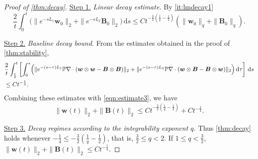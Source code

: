 \documentclass[10pt]{amsart}
\theoremstyle{plain}
\theoremstyle{definition}
\theoremstyle{remark}
\numberwithin{equation}{section}
\newcommand{\bw}{{\boldsymbol{w}}}
\newcommand{\bB}{{\boldsymbol{B}}}
\begin{document}
\begin{proof}[Proof of \cref{thm:decay}]

\uline{Step 1.} \emph{Linear decay estimate.} By
\cref{it:lmdecay1}
\[
\frac{2}{t} \int_0^t \bigl( \|e^{-sL_1} \bw_{0}\|_2 + \|e^{-sL_2} \bB_0\|_2 \bigr) \, \mathrm{d} s 
\le Ct^{-\frac{3}{2}(\frac{1}{q}-\frac{1}{2})} (\|\bw_0\|_q + \|\bB_0\|_q).
\]


\uline{Step 2.} \emph{Baseline decay bound.} 
From the estimates obtained in the proof of \cref{thm:stability}, 
\begin{align*}
&\frac{2}{t} \int_{\frac{t}{2}}^{t} \left[ \int_0^s \Bigl( \|e^{-(s-\tau)L_1} \mathbb{P}\nabla\cdot (\bw \otimes \bw - \bB \otimes \bB)\|_2 
+ \|e^{-(s-\tau)L_2} \mathbb{P}\nabla\cdot (\bw\otimes \bB - \bB \otimes \bw)\|_2 \Bigr) \, \mathrm{d} \tau \right] \, \mathrm{d}s \\
&\le Ct^{-\frac{1}{4}}.
\end{align*}
Combining these estimates with \cref{eqn:estimate3}, we have
\[
\|\bw(t)\|_2+\|\bB(t)\|_2 \le Ct^{-\frac{3}{2}(\frac{1}{q}-\frac{1}{2})} + Ct^{-\frac{1}{4}}.
\]

\uline{Step 3.} \emph{Decay regimes according to the integrability exponent $q$.} Thus \cref{thm:decay} holds whenever $-\frac{1}{4} \le -\frac{3}{2}(\frac{1}{q}-\frac{1}{2})$, that is, $\frac{3}{2} \le q <2$. If $1 \le q < \frac{3}{2}$, $\|\bw(t)\|_2+\|\bB(t)\|_2 \le Ct^{-\frac{1}{4}}$. 



\end{proof}
\end{document}
